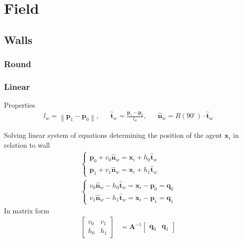 \section{Field}
\subsection{Walls}
\subsubsection{Round}

\subsubsection{Linear}
Properties
\begin{align}
l_{w} = \left\|\mathbf{p}_{1} - \mathbf{p}_{0}\right\|, && \hat{\mathbf{t}}_{w} = \frac{\mathbf{p}_{1} - \mathbf{p}_{0}}{l_{w}}, && \hat{\mathbf{n}}_{w} = R(90^{\circ}) \cdot \hat{\mathbf{t}}_{w}
\end{align}

Solving linear system of equations determining the position of the agent $ \mathbf{x}_{i} $ in relation to wall
\begin{align}
\begin{cases}
\mathbf{p}_{0} + v_{0} \hat{\mathbf{n}}_{w} = \mathbf{x}_{i} + h_{0} \hat{\mathbf{t}}_{w} \\
\mathbf{p}_{1} + v_{1} \hat{\mathbf{n}}_{w} = \mathbf{x}_{i} + h_{1} \hat{\mathbf{t}}_{w}
\end{cases} 
\\
\begin{cases}
v_{0} \hat{\mathbf{n}}_{w} - h_{0} \hat{\mathbf{t}}_{w} = \mathbf{x}_{i} - \mathbf{p}_{0} =  \mathbf{q}_{0} \\
v_{1} \hat{\mathbf{n}}_{w} - h_{1} \hat{\mathbf{t}}_{w} = \mathbf{x}_{i} - \mathbf{p}_{1} = \mathbf{q}_{1}
\end{cases}
\end{align}
In matrix form
\begin{align}
\begin{bmatrix} v_{0} & v_{1} \\ h_{0} & h_{1} \end{bmatrix} &= \mathbf{A}^{-1} \begin{bmatrix} \mathbf{q}_{0} & \mathbf{q}_{1} \end{bmatrix}
\end{align}

